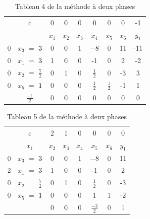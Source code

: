 \begin{table}
\centering
\begin{tabular}{|c|c|c|c|c|c|c|c|c|}
	\hline
      & c & 0 & 0 & 0 & 0 & 0 & 0 & -1 \\ 
      \cline{2-9}
       &  & $x_{1}$ & $x_{2}$  & $x_{3}$  & $x_{4}$ & $x_{5}$ & $x_{6}$ & $y_{1}$ \\
       \hline
   0 & $x_{3}$  $=$ $3$ & 0 & 0 & 1 & $-8$ & $0$ & 11 & -11 \\
      \hline
	0 & $x_{1}$ $=$ 3 & 1 & 0 & 0 & -1 & 0 & 2 & -2 \\
	  \hline
	0 & $x_{2}$ $=$ $\frac{7}{2}$  & 0 & 1 & 0 & $\frac{1}{2}$ & 0 & -3 & 3\\
	  \hline
	0 & $x_{5}$ $=$ $1$  & 0 & 0 & 0 & $\frac{1}{2}$ & $\frac{1}{2}$ & -1 & 1\\
	  \hline
	 & $\frac{-1}{2}$ & 0 & 0 & 0 & 0 & 0 & 0 & 0\\
	  \hline
	\end{tabular}
\caption{Tableau 4 de la méthode à deux phases}
\end{table}
\begin{table}
\centering

\begin{tabular}{|c|c|c|c|c|c|c|c|}
	\hline
      & c & 2 & 1 & 0 & 0 & 0 & 0  \\ 
    \cline{2-8}	
       & $x_{1}$ & $x_{2}$ & $x_{3}$  & $x_{4}$ & $x_{5}$ & $x_{6}$ & $y_{1}$ \\
       \hline
   0 & $x_{3}$  $=$ $3$ & 0 & 0 & 1 & $-8$ & $0$ & 11 \\
      \hline
	2 & $x_{1}$ $=$ 3 & 1 & 0 & 0 & -1 & 0 & 2  \\
	  \hline
	0 & $x_{2}$ $=$ $\frac{7}{2}$  & 0 & 1 & 0 & $\frac{1}{2}$ & 0 & -3 \\
	  \hline
	0 & $x_{5}$ $=$ $1$  & 0 & 0 & 0 & 1 & 1 & -2 \\
	  \hline
	 &  & 0 & 0 & 0 & $\frac{-3}{2}$ & 0 & 1 \\
	  \hline
	\end{tabular}
\caption {Tableau 5 de la méthode à deux phases}
\end{table}

